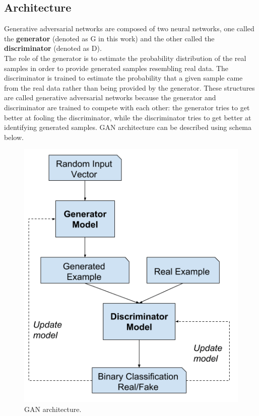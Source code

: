 \documentclass[12pt,a4paper,openany]{book}
\begin{document}
\subsection{Architecture}
\noindent Generative adversarial networks are composed of two neural networks, one called the \textbf{generator} (denoted as G in this work) and the other called the \textbf{discriminator} (denoted as D). \\
\noindent The role of the generator is to estimate the probability distribution of the real samples in order to provide generated samples resembling real data. The discriminator is trained to estimate the probability that a given sample came from the real data rather than being provided by the generator.
\noindent These structures are called generative adversarial networks because the generator and discriminator are trained to compete with each other: the generator tries to get better at fooling the discriminator, while the discriminator tries to get better at identifying generated samples.  GAN architecture can be described using schema below.
 \begin{figure}[H]
     \centering
     \includegraphics[scale=0.3]{figs/gan_architecture.png}
     \caption{GAN architecture.}
 \end{figure}
\end{document}
